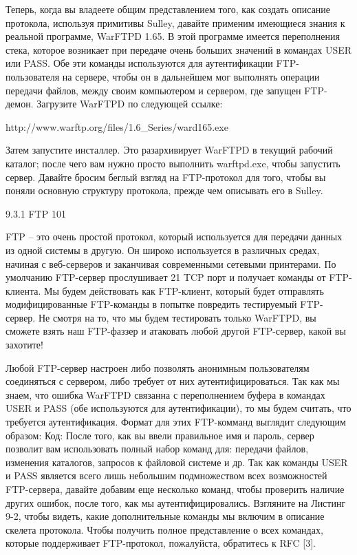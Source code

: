 \documentclass[12pt]{book}
\begin{document}
Теперь, когда вы владеете общим представлением того, как создать описание протокола, используя примитивы Sulley, давайте применим имеющиеся знания к реальной программе, WarFTPD 1.65. В этой программе имеется переполнения стека, которое возникает при передаче очень больших значений в командах USER или PASS. Обе эти команды используются для аутентификации FTP-пользователя на сервере, чтобы он в дальнейшем мог выполнять операции передачи файлов, между своим компьютером и сервером, где запущен FTP-демон. Загрузите WarFTPD по следующей ссылке:

http://www.warftp.org/files/1.6\_Series/ward165.exe

Затем запустите инсталлер. Это разархивирует WarFTPD в текущий рабочий каталог; после чего вам нужно просто выполнить warftpd.exe, чтобы запустить сервер. Давайте бросим беглый взгляд на FTP-протокол для того, чтобы вы поняли основную структуру протокола, прежде чем описывать его в Sulley.

9.3.1 FTP 101

FTP – это очень простой протокол, который используется для передачи данных из одной системы в другую. Он широко используется в различных средах, начиная с веб-серверов и заканчивая современными сетевыми принтерами. По умолчанию FTP-сервер прослушивает 21 TCP порт и получает команды от FTP-клиента. Мы будем действовать как FTP-клиент, который будет отправлять модифицированные FTP-команды в попытке повредить тестируемый FTP-сервер. Не смотря на то, что мы будем тестировать только WarFTPD, вы сможете взять наш FTP-фаззер и атаковать любой другой FTP-сервер, какой вы захотите!

Любой FTP-сервер настроен либо позволять анонимным пользователям соединяться с сервером, либо требует от них аутентифицироваться. Так как мы знаем, что ошибка WarFTPD связанна с переполнением буфера в командах USER и PASS (обе используются для аутентификации), то мы будем считать, что требуется аутентификация. Формат для этих FTP-комманд выглядит следующим образом:
Код:
После того, как вы ввели правильное имя и пароль, сервер позволит вам использовать полный набор команд для: передачи файлов, изменения каталогов, запросов к файловой системе и др. Так как команды USER и PASS является всего лишь небольшим подмножеством всех возможностей FTP-сервера, давайте добавим еще несколько команд, чтобы проверить наличие других ошибок, после того, как мы аутентифицировались. Взгляните на Листинг 9-2, чтобы видеть, какие дополнительные команды мы включим в описание скелета протокола. Чтобы получить полное представление о всех командах, которые поддерживает FTP-протокол, пожалуйста, обратитесь к RFC [3].
\end{document}
